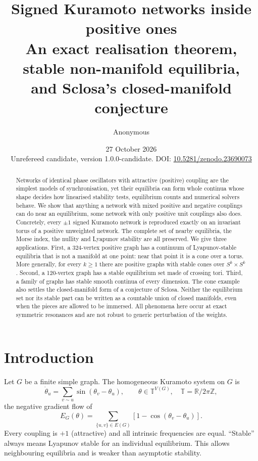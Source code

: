 \documentclass[11pt,a4paper]{article}
\title{\textbf{Signed Kuramoto networks inside positive ones}\\[5pt]
\large An exact realisation theorem, stable non-manifold equilibria,\\ and Sclosa's closed-manifold conjecture}
\author{Anonymous}
\date{27 October 2026\\[3pt]\small Unrefereed candidate, version 1.0.0-candidate. DOI: \href{https://doi.org/10.5281/zenodo.23690073}{10.5281/zenodo.23690073}}
\theoremstyle{definition}\newtheorem{conjecture}{Conjecture}
\theoremstyle{remark}\newtheorem{remark}[theorem]{Remark}
\newcommand{\T}{\mathbb T}
\newcommand{\R}{\mathbb R}
\newcommand{\Z}{\mathbb Z}
\begin{document}
\maketitle
\vspace{-14pt}
\begin{abstract}
Networks of identical phase oscillators with attractive (positive) coupling are the simplest models of synchronisation, yet their equilibria can form whole continua whose shape decides how linearised stability tests, equilibrium counts and numerical solvers behave. We show that anything a network with mixed positive and negative couplings can do near an equilibrium, some network with only positive unit couplings also does. Concretely, every $\pm1$ signed Kuramoto network is reproduced exactly on an invariant torus of a positive unweighted network. The complete set of nearby equilibria, the Morse index, the nullity and Lyapunov stability are all preserved. We give three applications. First, a 324-vertex positive graph has a continuum of Lyapunov-stable equilibria that is not a manifold at one point: near that point it is a cone over a torus. More generally, for every $k\ge1$ there are positive graphs with stable cones over $S^k\times S^k$. Second, a 120-vertex graph has a stable equilibrium set made of crossing tori. Third, a family of graphs has stable smooth continua of every dimension. The cone example also settles the closed-manifold form of a conjecture of Sclosa. Neither the equilibrium set nor its stable part can be written as a countable union of closed manifolds, even when the pieces are allowed to be immersed. All phenomena here occur at exact symmetric resonances and are not robust to generic perturbation of the weights.
\end{abstract}

\section{Introduction}\label{sec:intro}

Let $G$ be a finite simple graph. The homogeneous Kuramoto system on $G$ is
\begin{equation}\label{eq:flow}
 \dot\theta_u=\sum_{v\sim u}\sin(\theta_v-\theta_u),\qquad \theta\in\T^{V(G)},\quad \T=\R/2\pi\Z,
\end{equation}
the negative gradient flow of
\begin{equation}\label{eq:energy}
 E_G(\theta)=\sum_{\{u,v\}\in E(G)}[1-\cos(\theta_v-\theta_u)].
\end{equation}
Every coupling is $+1$ (attractive) and all intrinsic frequencies are equal. ``Stable'' always means Lyapunov stable for an individual equilibrium. This allows neighbouring equilibria and is weaker than asymptotic stability.
\end{document}
